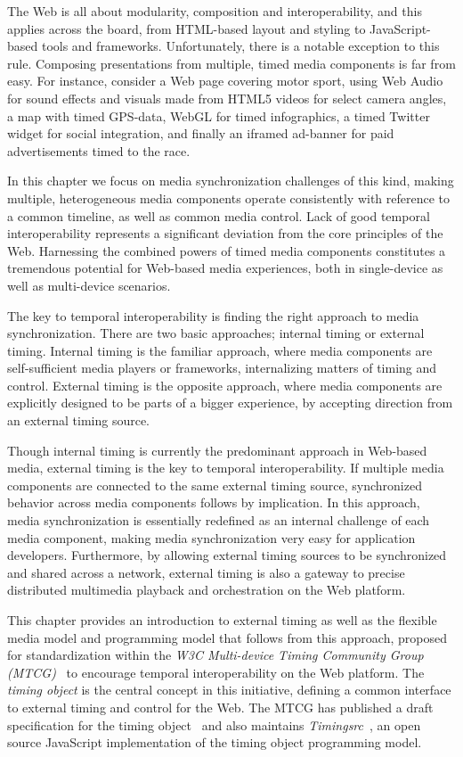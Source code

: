 The Web is all about modularity, composition and interoperability, and this
applies across the board, from HTML-based layout and styling to JavaScript-based 
tools and frameworks. Unfortunately, there is a notable exception to
this rule. Composing presentations from multiple, timed media components is
far from easy. For instance, consider a Web page covering motor sport, using
Web Audio for sound effects and visuals made from HTML5 videos for select
camera angles, a map with timed GPS-data, WebGL for timed infographics, a
timed Twitter widget for social integration, and finally an iframed ad-banner
for paid advertisements timed to the race.

In this chapter we focus on media synchronization challenges of this kind,
making multiple, heterogeneous media components operate consistently with
reference to a common timeline, as well as common media control. Lack of good
temporal interoperability represents a significant deviation from the core
principles of the Web. Harnessing the combined powers of timed media
components constitutes a tremendous potential for Web-based media experiences,
both in single-device as well as multi-device scenarios.

The key to temporal interoperability is finding the right approach to media
synchronization. There are two basic approaches; internal timing or external
timing. Internal timing is the familiar approach, where media components are
self-sufficient media players or frameworks, internalizing matters of timing
and control. External timing is the opposite approach, where media components
are explicitly designed to be parts of a bigger experience, by accepting
direction from an external timing source.

Though internal timing is currently the predominant approach in Web-based
media, external timing is the key to temporal interoperability. If multiple
media components are connected to the same external timing source,
synchronized behavior across media components follows by implication. In this
approach, media synchronization is essentially redefined as an internal
challenge of each media component, making media synchronization very easy for
application developers. Furthermore, by allowing external timing sources to be
synchronized and shared across a network, external timing is also a gateway to
precise distributed multimedia playback and orchestration on the Web platform.

This chapter provides an introduction to external timing as well as the
flexible media model and programming model that follows from this approach,
proposed for standardization within the \emph{W3C Multi-device Timing Community
Group (MTCG)}~\cite{mtcg} to encourage temporal interoperability on the Web platform.
The \emph{timing object} is the central concept in this initiative, defining a common
interface to external timing and control for the Web. The MTCG has published a
draft specification for the timing object~\cite{timingobject} and also maintains \emph{Timingsrc}~\cite{timingsrc}, an open source JavaScript implementation of the timing object
programming model.

